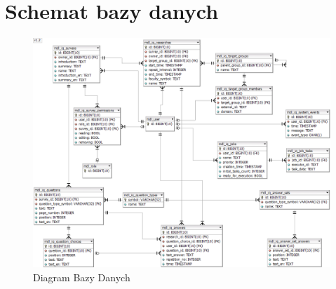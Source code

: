 \chapter{Schemat bazy danych}
\label{Chapterc1}

\begin{landscape}
\begin{figure}[th]
\centering\includegraphics[height=\textheight, width=\textwidth]{figures/iQuest_Database}
\caption{Diagram Bazy Danych}\label{rys:iQuest_DataBase}
\end{figure}
\end{landscape}